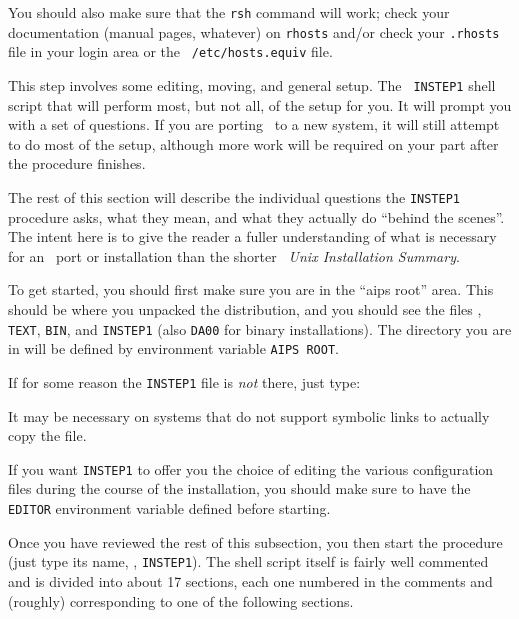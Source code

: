 You should also make sure that the {\tt rsh} command will work; check your
documentation (manual pages, whatever) on {\tt rhosts} and/or check your
{\tt .rhosts} file in your login area or the {\tt
/etc/hosts.equiv} file.

\medskip{}

This step involves some editing, moving, and general setup.  The {\tt
INSTEP1} shell script that will perform most, but not all, of the setup
for you.  It will prompt you with a set of questions.  If you are porting
\AIPS\ to a new system, it will still attempt to do most of the setup,
although more work will be required on your part after the procedure
finishes.

The rest of this section will describe the individual questions the
{\tt INSTEP1} procedure asks, what they mean, and what they actually
do ``behind the scenes''.  The intent here is to give the reader a
fuller understanding of what is necessary for an \AIPS\ port or
installation than the shorter {\it \AIPS\ Unix Installation
Summary\/}.

To get started, you should first make sure you are in the ``aips root''
area.  This should be where you unpacked the distribution, and you should
see the files {\tt\thisver}, {\tt TEXT}, {\tt BIN}, and {\tt INSTEP1}
(also {\tt DA00} for binary installations).  The directory you are in will
be defined by environment variable {\tt\dol AIPS ROOT}.

If for some reason the {\tt INSTEP1} file is {\it not\/} there, just
type:\medskip

\medskip

\noindent It may be necessary on systems that do not support
symbolic links to actually copy the file.

If you want {\tt INSTEP1} to offer you the choice of editing the various
configuration files during the course of the installation, you should make
sure to have the {\tt EDITOR} environment variable defined before
starting.

Once you have reviewed the rest of this subsection, you then
start the procedure (just type its name, \ie, {\tt INSTEP1}).  The
shell script itself is fairly well commented and is divided into about
17 sections, each one numbered in the comments and (roughly)
corresponding to one of the following sections.\medskip


